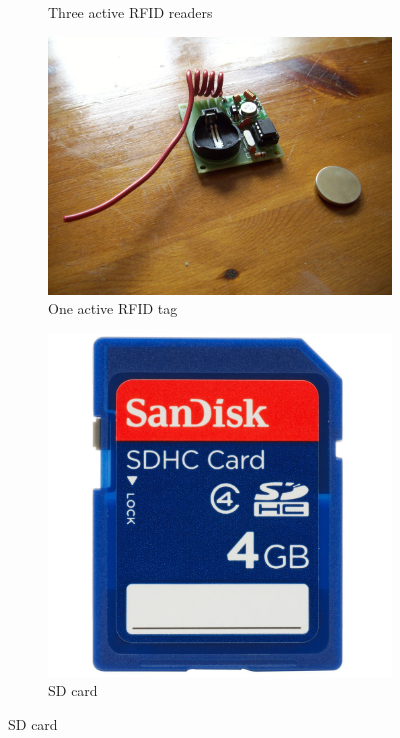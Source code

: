 \documentclass[a4paper,11pt]{scrartcl}
\begin{document}
\begin{figure}[h]
\begin{subfigure}[b]{0.3\textwidth}
		\caption{Three active RFID readers}
	\end{subfigure}
	\begin{subfigure}[b]{0.3\textwidth}
		\includegraphics[width=\textwidth]{tag}
		\caption{One active RFID tag}
	\end{subfigure}
	\begin{subfigure}[b]{0.2\textwidth}
		\includegraphics[width=\textwidth]{sdcard}
		\caption{SD card}
	\end{subfigure}

\end{figure}
\end{document}
